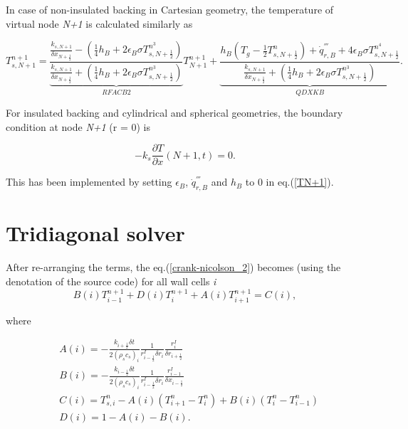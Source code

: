 In case of non-insulated backing in Cartesian geometry, the temperature of virtual node \textit{N+1} is calculated similarly as

\begin{equation}
\label{TN+1}
  T_{s,N+1}^{n+1} = \underbrace{\frac{\frac{k_{s,N+1}}{\delta x_{N+\frac{1}{2}}}-(\frac{1}{4}h_B+2\epsilon_B \sigma T_{s,N+\frac{1}{2}}^{n^3})}{\frac{k_{s,N+1}}{\delta x_{N+\frac{1}{2}}}+(\frac{1}{4}h_B+2\epsilon_B \sigma T_{s,N+\frac{1}{2}}^{n^3})}}_{RFACB2} T_{N+1}^{n+1}+
 \underbrace{\frac{h_B(T_g-\frac{1}{2}T_{s,N+\frac{1}{2}}^n)+\dot{q}_{r,B}^{'''}+4\epsilon_B \sigma T_{s,N+\frac{1}{2}}^{n^4}}{\frac{k_{s,N+1}}{\delta x_{N+\frac{1}{2}}}+(\frac{1}{4}h_B+2\epsilon_B \sigma T_{s,N+\frac{1}{2}}^{n^3})}}_{QDXKB}.
\end{equation}

For insulated backing and cylindrical and spherical geometries, the boundary condition at node \textit{N+1} (r = 0) is

\begin{equation}
\label{bc_back}
  -k_s \frac{\partial T}{\partial x} (N+1,t) = 0.
\end{equation}

This has been implemented by setting $\epsilon_B$, $\dot{q}_{r,B}^{'''}$ and $h_B$ to 0 in eq.(\ref{TN+1}).

\section{Tridiagonal solver}
After re-arranging the terms, the eq.(\ref{crank-nicolson_2}) becomes (using the denotation of the source code) for all wall cells \textit{i}
 \begin{equation}
\label{tridiagonal_1}
  B(i)T_{i-1}^{n+1} + D(i)T_{i}^{n+1} + A(i)T_{i+1}^{n+1} = C(i),
\end{equation}

where

\begin{equation}
\label{tridiagonal_2}
\begin{split}
& A(i) = -\frac{k_{i+\frac{1}{2}}\delta t}{2(\rho_s c_s)_i}\frac{1}{r_{i-\frac{1}{2}}^I \delta r_i}\frac{r_{i}^I}{\delta r_{i+\frac{1}{2}}} \\
& B(i) = -\frac{k_{i-\frac{1}{2}}\delta t}{2(\rho_s c_s)_i}\frac{1}{r_{i-\frac{1}{2}}^I \delta r_i}\frac{r_{i-1}^I}{\delta x_{i-\frac{1}{2}}}  \\
& C(i) = T_{s,i}^{n}-A(i)(T_{i+1}^n-T_i^n) + B(i) (T_{i}^n-T_{i-1}^n) \\
& D(i) = 1-A(i)-B(i).  \\
\end{split}
\end{equation}

